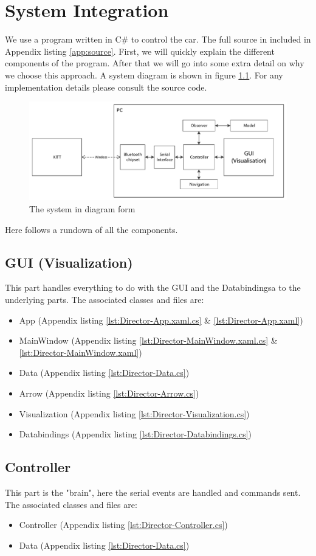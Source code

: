\documentclass[final]{scrreprt} %
\begin{document}
\chapter{System Integration}
\label{ch:system-integration}
We use a program written in C\# to control the car.
The full source in included in Appendix listing \ref{app:source}.
First, we will quickly explain the different components of the program.
After that we will go into some extra detail on why we choose this approach.
A system diagram is shown in figure \ref{fig:system-diagram}.
For any implementation details please consult the source code.
\begin{figure}[H]
	\centering    	
    	\includegraphics[width=\textwidth]{resources/system-diagram.pdf}
    	\caption{The system in diagram form}
    	\label{fig:system-diagram}
\end{figure}
Here follows a rundown of all the components.
\section{GUI (Visualization)}
This part handles everything to do with the GUI and the Databindingsa to the underlying parts.
The associated classes and files are:
\begin{itemize}
\item App (Appendix listing \ref{lst:Director-App.xaml.cs} \& \ref{lst:Director-App.xaml})
\item MainWindow (Appendix listing \ref{lst:Director-MainWindow.xaml.cs} \& \ref{lst:Director-MainWindow.xaml})
\item Data (Appendix listing \ref{lst:Director-Data.cs})
\item Arrow (Appendix listing \ref{lst:Director-Arrow.cs})
\item Visualization (Appendix listing \ref{lst:Director-Visualization.cs})
\item Databindings (Appendix listing \ref{lst:Director-Databindings.cs})
\end{itemize}
\section{Controller}
This part is the "brain", here the serial events are handled and commands sent.
The associated classes and files are:
\begin{itemize}
\item Controller (Appendix listing \ref{lst:Director-Controller.cs})
\item Data (Appendix listing \ref{lst:Director-Data.cs})
\end{itemize}
\end{document}
